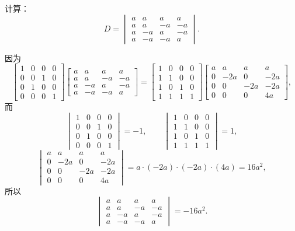 \begin{example}
计算：\[
D = \begin{vmatrix}
a & a & a & a \\
a & a & -a & -a \\
a & -a & a & -a \\
a & -a & -a & a
\end{vmatrix}.
\]
\begin{solution}
因为\[
\begin{bmatrix}
1 & 0 & 0 & 0 \\
0 & 0 & 1 & 0 \\
0 & 1 & 0 & 0 \\
0 & 0 & 0 & 1
\end{bmatrix} \begin{bmatrix}
a & a & a & a \\
a & a & -a & -a \\
a & -a & a & -a \\
a & -a & -a & a
\end{bmatrix}
= \begin{bmatrix}
1 & 0 & 0 & 0 \\
1 & 1 & 0 & 0 \\
1 & 0 & 1 & 0 \\
1 & 1 & 1 & 1
\end{bmatrix} \begin{bmatrix}
a & a & a & a \\
0 & -2 a & 0 & -2 a \\
0 & 0 & -2 a & -2 a \\
0 & 0 & 0 & 4 a
\end{bmatrix},
\]而\[
\begin{vmatrix}
1 & 0 & 0 & 0 \\
0 & 0 & 1 & 0 \\
0 & 1 & 0 & 0 \\
0 & 0 & 0 & 1
\end{vmatrix} = -1, \qquad
\begin{vmatrix}
1 & 0 & 0 & 0 \\
1 & 1 & 0 & 0 \\
1 & 0 & 1 & 0 \\
1 & 1 & 1 & 1
\end{vmatrix} = 1,
\]\[
\begin{vmatrix}
a & a & a & a \\
0 & -2 a & 0 & -2 a \\
0 & 0 & -2 a & -2 a \\
0 & 0 & 0 & 4 a
\end{vmatrix} = a\cdot(-2a)\cdot(-2a)\cdot(4a) = 16a^2,
\]所以\[
\begin{vmatrix}
a & a & a & a \\
a & a & -a & -a \\
a & -a & a & -a \\
a & -a & -a & a
\end{vmatrix} = -16a^2.
\]
\end{solution}
\end{example}

